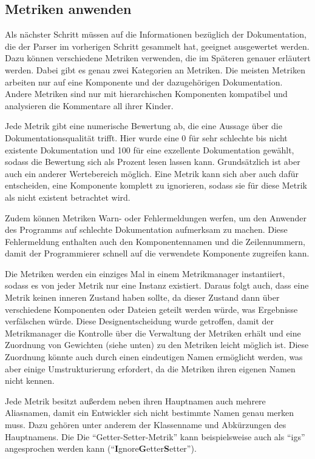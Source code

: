 \subsection{Metriken anwenden}

Als nächster Schritt müssen auf die Informationen bezüglich der Dokumentation, die der Parser im vorherigen Schritt gesammelt hat, geeignet ausgewertet werden. Dazu können verschiedene Metriken verwenden, die im Späteren genauer erläutert werden. Dabei gibt es genau zwei Kategorien an Metriken. Die meisten Metriken arbeiten nur auf eine Komponente und der dazugehörigen Dokumentation. Andere Metriken sind nur mit hierarchischen Komponenten kompatibel und analysieren die Kommentare all ihrer Kinder. 

Jede Metrik gibt eine numerische Bewertung ab, die eine Aussage über die Dokumentationsqualität trifft. Hier wurde eine 0 für sehr schlechte bis nicht existente Dokumentation und 100 für eine exzellente Dokumentation gewählt, sodass die Bewertung sich als Prozent lesen lassen kann. Grundsätzlich ist aber auch ein anderer Wertebereich möglich. Eine Metrik kann sich aber auch dafür entscheiden, eine Komponente komplett zu ignorieren, sodass sie für diese Metrik als nicht existent betrachtet wird.

Zudem können Metriken Warn- oder Fehlermeldungen werfen, um den Anwender des Programms auf schlechte Dokumentation aufmerksam zu machen. Diese Fehlermeldung enthalten auch den Komponentennamen und die Zeilennummern, damit der Programmierer schnell auf die verwendete Komponente zugreifen kann.

Die Metriken werden ein einziges Mal in einem Metrikmanager instantiiert, sodass es von jeder Metrik nur eine Instanz existiert. Daraus folgt auch, dass eine Metrik keinen inneren Zustand haben sollte, da dieser Zustand dann über verschiedene Komponenten  oder Dateien geteilt werden würde, was Ergebnisse verfälschen würde. Diese Designentscheidung wurde getroffen, damit der Metrikmanager die Kontrolle über die Verwaltung der Metriken erhält und eine Zuordnung von Gewichten (siehe unten) zu den Metriken leicht möglich ist. Diese Zuordnung könnte auch durch einen eindeutigen Namen ermöglicht werden, was aber einige Umstrukturierung erfordert, da die Metriken ihren eigenen Namen nicht kennen.

Jede Metrik besitzt außerdem neben ihren Hauptnamen auch mehrere Aliasnamen, damit ein Entwickler sich nicht bestimmte Namen genau merken muss. Dazu gehören unter anderem der Klassenname und Abkürzungen des Hauptnamens. Die Die \enquote{Getter-Setter-Metrik} kann beispielsweise auch als \enquote{igs} angesprochen werden kann (\enquote{\textbf{I}gnore\textbf{G}etter\textbf{S}etter}). 

